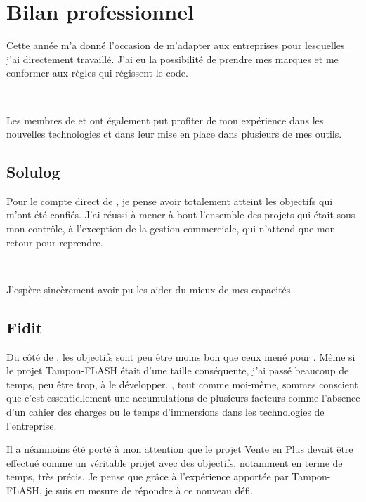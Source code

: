 \chapter{Bilan professionnel}
Cette année m'a donné l'occasion de m'adapter aux entreprises pour lesquelles j'ai directement travaillé. J'ai eu la possibilité de prendre mes marques et me conformer aux règles qui régissent le code.

~

Les membres de \solulog{} et \fidit{} ont également put profiter de mon expérience dans les nouvelles technologies et dans leur mise en place dans plusieurs de mes outils.

\section{Solulog}
Pour le compte direct de \solulog, je pense avoir totalement atteint les objectifs qui m'ont été confiés. J'ai réussi à mener à bout l'ensemble des projets qui était sous mon contrôle, à l'exception de la gestion commerciale, qui n'attend que mon retour pour reprendre.

~

J'espère sincèrement avoir pu les aider du mieux de mes capacités.

\section{Fidit}
Du côté de \fidit, les objectifs sont peu être moins bon que ceux mené pour \solulog. Même si le projet Tampon-FLASH était d'une taille conséquente, j'ai passé beaucoup de temps, peu être trop, à le développer. \fidit, tout comme moi-même, sommes conscient que c'est essentiellement une accumulations de plusieurs facteurs comme l'absence d'un cahier des charges ou le temps d'immersions dans les technologies de l'entreprise.

Il a néanmoins été porté à mon attention que le projet \og Vente en Plus \fg{} devait être effectué comme un véritable projet avec des objectifs, notamment en terme de temps, très précis. Je pense que grâce à l'expérience apportée par Tampon-FLASH, je suis en mesure de répondre à ce nouveau défi.
